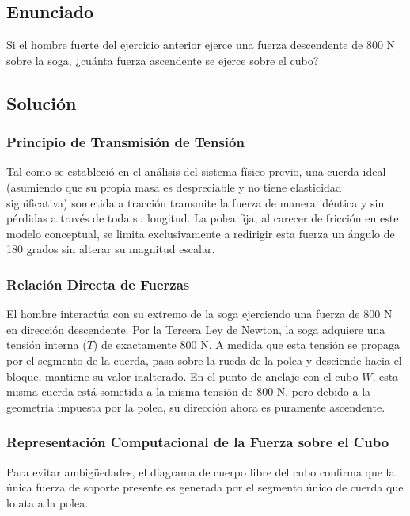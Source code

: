 \documentclass[12pt,letterpaper]{article}
\begin{document}
\newpage

\subsection*{Enunciado}
Si el hombre fuerte del ejercicio anterior ejerce una fuerza descendente de $800\text{ N}$ sobre la soga, ¿cuánta fuerza ascendente se ejerce sobre el cubo?

\subsection*{Solución}

\subsubsection*{Principio de Transmisión de Tensión}
Tal como se estableció en el análisis del sistema físico previo, una cuerda ideal (asumiendo que su propia masa es despreciable y no tiene elasticidad significativa) sometida a tracción transmite la fuerza de manera idéntica y sin pérdidas a través de toda su longitud. La polea fija, al carecer de fricción en este modelo conceptual, se limita exclusivamente a redirigir esta fuerza un ángulo de 180 grados sin alterar su magnitud escalar.

\subsubsection*{Relación Directa de Fuerzas}
El hombre interactúa con su extremo de la soga ejerciendo una fuerza de $800\text{ N}$ en dirección descendente. Por la Tercera Ley de Newton, la soga adquiere una tensión interna ($T$) de exactamente $800\text{ N}$. 
A medida que esta tensión se propaga por el segmento de la cuerda, pasa sobre la rueda de la polea y desciende hacia el bloque, mantiene su valor inalterado. En el punto de anclaje con el cubo $W$, esta misma cuerda está sometida a la misma tensión de $800\text{ N}$, pero debido a la geometría impuesta por la polea, su dirección ahora es puramente ascendente.

\subsubsection*{Representación Computacional de la Fuerza sobre el Cubo}
Para evitar ambigüedades, el diagrama de cuerpo libre del cubo confirma que la única fuerza de soporte presente es generada por el segmento único de cuerda que lo ata a la polea.
\end{document}
